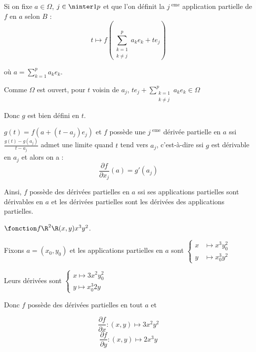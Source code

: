 \begin{remarque}
    Si on fixe $a \in \Omega$, $j \in \ninter 1 p$ et que l'on définit la $j^{\text{ eme}}$ 
    application partielle de $f$ en $a$ selon $B$ : 
    $$t \mapsto f\left(\sum_{\substack{k = 1 \\k \neq j}}^p a_ke_k + t e_j \right)$$

    où $a = \displaystyle \sum_{k = 1 }^{p }a_k e_k$. 

    Comme $\Omega$ est ouvert, pour $t$ voisin de $a_j$, $\displaystyle t e_j + \sum_{\substack{k = 1 \\ k \neq j}}^{p } a_k e_k \in \Omega$

    Donc $g$ est bien défini en $t$. 

    $g(t) = f(a + (t - a_j) e_j)$ et $f$ possède une $j^{\text{ eme}}$ dérivée partielle en $a$ 
    ssi $\frac{g(t) - g(a_j)} {t - a_j}$ admet une limite quand $t$ tend vers $a_j$, c'est-à-dire ssi $g$ est dérivable en $a_j$
    et alors on a :
    $$\frac{\partial f}{\partial x_j}(a) = g'(a_j)$$

    Ainsi, $f$ possède des dérivées partielles en $a$ ssi ses applications partielles sont dérivables
    en $a$ et les dérivées partielles sont les dérivées des applications partielles.
\end{remarque}

\begin{exemple}
    $\fonction f {\R^2}{\R}{(x, y)}{x^3 y^2}$. 

    Fixons $a = (x_0, y_0)$ et les applications partielles en $a$ sont 
    $\begin{cases}
        x & \mapsto x^3 y_0^2 \\
        y & \mapsto x_0^3 y^2
    \end{cases}$

    Leurs dérivées sont $\begin{cases}
        x \mapsto 3 x^2 y_0^2 \\
        y \mapsto x_0^3 2y
    \end{cases}$

    Donc $f$ possède des dérivées partielles en tout $a$ et 

    $$\frac{\partial f}{\partial x} : (x, y) \mapsto 3 x^2 y^2$$
    $$\frac{\partial f } {\partial y } : (x, y) \mapsto 2 x^3 y$$
\end{exemple}


